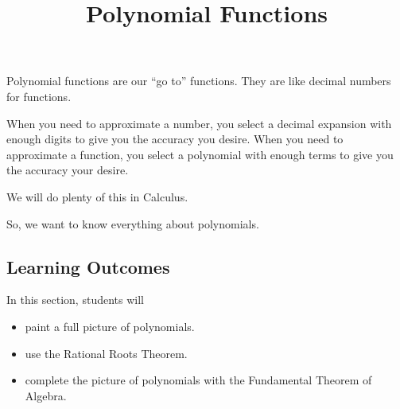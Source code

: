 \documentclass{ximera}
\title{Polynomial Functions}
\begin{document}
\begin{abstract}
\end{abstract}
\maketitle






Polynomial functions are our ``go to'' functions.  They are like decimal numbers for functions.  

When you need to approximate a number, you select a decimal expansion with enough digits to give you the accuracy you desire. When you need to approximate a function, you select a polynomial with enough terms to give you the accuracy your desire. 

We will do plenty of this in Calculus.

So, we want to know everything about polynomials.
















\subsection{Learning Outcomes}

\begin{sectionOutcomes}
In this section, students will 

\begin{itemize}
\item paint a full picture of polynomials.
\item use the Rational Roots Theorem.
\item complete the picture of polynomials with the Fundamental Theorem of Algebra.
\end{itemize}
\end{sectionOutcomes}
\end{document}
